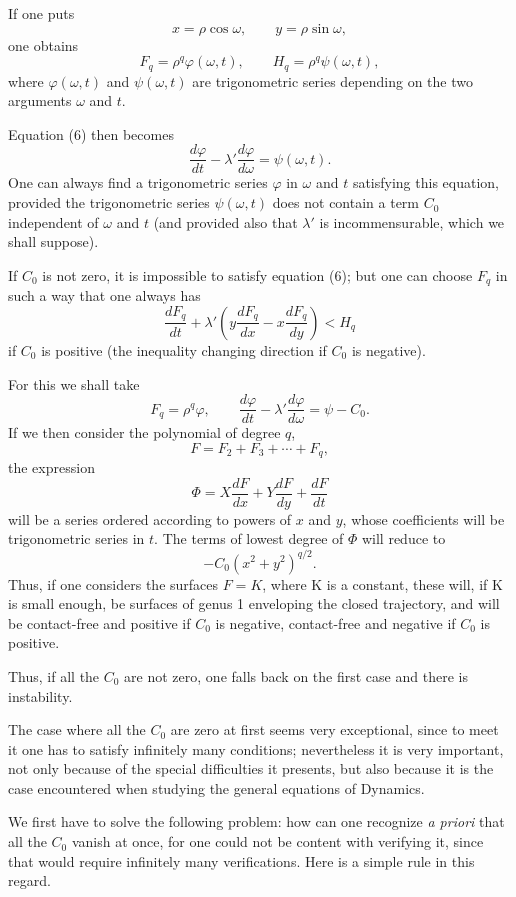 \documentclass[11pt]{article}
\begin{document}
If one puts
\[
x=\rho\cos\omega,
\qquad
 y=\rho\sin\omega,
\]
one obtains
\[
F_q=\rho^q\varphi(\omega,t),
\qquad
H_q=\rho^q\psi(\omega,t),
\]
where $\varphi(\omega,t)$ and $\psi(\omega,t)$ are trigonometric series depending on the two arguments $\omega$ and $t$.

Equation (6) then becomes
\begin{equation}
\frac{d\varphi}{dt}-\lambda'\frac{d\varphi}{d\omega}=\psi(\omega,t).
\tag{6 bis}
\end{equation}
One can always find a trigonometric series $\varphi$ in $\omega$ and $t$ satisfying this equation, provided the trigonometric series $\psi(\omega,t)$ does not contain a term $C_0$ independent of $\omega$ and $t$ (and provided also that $\lambda'$ is incommensurable, which we shall suppose).

If $C_0$ is not zero, it is impossible to satisfy equation (6); but one can choose $F_q$ in such a way that one always has
\[
\frac{dF_q}{dt}+\lambda'\left(y\frac{dF_q}{dx}-x\frac{dF_q}{dy}\right)<H_q
\]
if $C_0$ is positive (the inequality changing direction if $C_0$ is negative).

For this we shall take
\[
F_q=\rho^q\varphi,
\qquad
\frac{d\varphi}{dt}-\lambda'\frac{d\varphi}{d\omega}=\psi-C_0.
\]
If we then consider the polynomial of degree $q$,
\[
F=F_2+F_3+\cdots+F_q,
\]
the expression
\[
\Phi=X\frac{dF}{dx}+Y\frac{dF}{dy}+\frac{dF}{dt}
\]
will be a series ordered according to powers of $x$ and $y$, whose coefficients will be trigonometric series in $t$. The terms of lowest degree of $\Phi$ will reduce to
\[
-C_0(x^2+y^2)^{q/2}.
\]
Thus, if one considers the surfaces $F=K$, where K is a constant, these will, if K is small enough, be surfaces of genus 1 enveloping the closed trajectory, and will be contact-free and positive if $C_0$ is negative, contact-free and negative if $C_0$ is positive.

Thus, if all the $C_0$ are not zero, one falls back on the first case and there is instability.

The case where all the $C_0$ are zero at first seems very exceptional, since to meet it one has to satisfy infinitely many conditions; nevertheless it is very important, not only because of the special difficulties it presents, but also because it is the case encountered when studying the general equations of Dynamics.

We first have to solve the following problem: how can one recognize \emph{a priori} that all the $C_0$ vanish at once, for one could not be content with verifying it, since that would require infinitely many verifications. Here is a simple rule in this regard.
\end{document}
